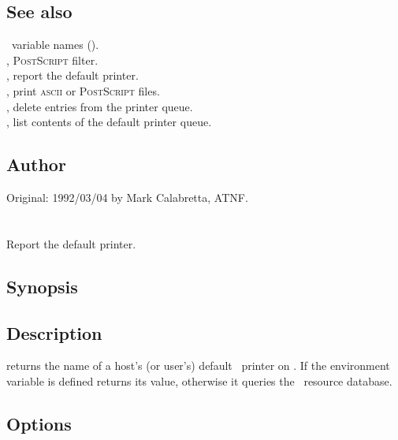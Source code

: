 \subsection*{See also}

\aipspp\ variable names ().\\
, \textsc{PostScript} filter.\\
, report the default printer.\\
, print \textsc{ascii} or \textsc{PostScript} files.\\
, delete entries from the printer queue.\\
, list contents of the default printer queue.

\subsection*{Author}

Original: 1992/03/04 by Mark Calabretta, ATNF.


\newpage
\section{}
\label{prd}

Report the default printer.

\subsection*{Synopsis}

\begin{synopsis}
\end{synopsis}

\subsection*{Description}

 returns the name of a host's (or user's) default \aipspp\ printer
on .  If the  environment variable is defined
 returns its value, otherwise it queries the \aipspp\ resource
database.

\subsection*{Options}


